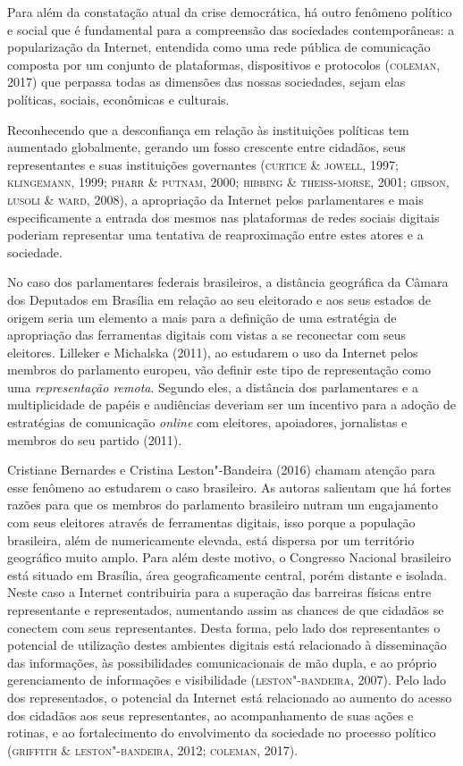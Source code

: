 Para além da constatação atual da crise democrática, há outro fenômeno
político e social que é fundamental para a compreensão das sociedades
contemporâneas: a popularização da Internet, entendida como uma rede
pública de comunicação composta por um conjunto de plataformas,
dispositivos e protocolos (\textsc{coleman}, 2017) que perpassa todas as
dimensões das nossas sociedades, sejam elas políticas, sociais,
econômicas e culturais.

Reconhecendo que a desconfiança em relação às instituições políticas tem
aumentado globalmente, gerando um fosso crescente entre cidadãos, seus
representantes e suas instituições governantes (\textsc{curtice \& jowell}, 1997;
\textsc{klingemann}, 1999; \textsc{pharr \& putnam}, 2000; \textsc{hibbing \& theiss-morse}, 2001;
\textsc{gibson, lusoli \& ward}, 2008), a apropriação da Internet pelos
parlamentares e mais especificamente a entrada dos mesmos nas
plataformas de redes sociais digitais poderiam representar uma tentativa
de reaproximação entre estes atores e a sociedade.

No caso dos parlamentares federais brasileiros, a distância geográfica
da Câmara dos Deputados em Brasília em relação ao seu eleitorado e aos
seus estados de origem seria um elemento a mais para a definição de uma
estratégia de apropriação das ferramentas digitais com vistas a se
reconectar com seus eleitores. Lilleker e Michalska (2011), ao estudarem
o uso da Internet pelos membros do parlamento europeu, vão definir este
tipo de representação como uma \textit{representação remota}. Segundo
eles, a distância dos parlamentares e a multiplicidade de papéis e
audiências deveriam ser um incentivo para a adoção de estratégias de
comunicação \textit{online} com eleitores, apoiadores, jornalistas e membros do
seu partido (2011).

Cristiane Bernardes e Cristina Leston"-Bandeira (2016) chamam atenção
para esse fenômeno ao estudarem o caso brasileiro. As autoras salientam
que há fortes razões para que os membros do parlamento brasileiro nutram
um engajamento com seus eleitores através de ferramentas digitais, isso
porque a população brasileira, além de numericamente elevada, está
dispersa por um território geográfico muito amplo. Para além deste
motivo, o Congresso Nacional brasileiro está situado em Brasília, área
geograficamente central, porém distante e isolada. Neste caso a Internet
contribuiria para a superação das barreiras físicas entre representante
e representados, aumentando assim as chances de que cidadãos se conectem
com seus representantes. Desta forma, pelo lado dos representantes o
potencial de utilização destes ambientes digitais está relacionado à
disseminação das informações, às possibilidades comunicacionais de mão
dupla, e ao próprio gerenciamento de informações e visibilidade
(\textsc{leston"-bandeira}, 2007). Pelo lado dos representados, o potencial da
Internet está relacionado ao aumento do acesso dos cidadãos aos seus
representantes, ao acompanhamento de suas ações e rotinas, e ao
fortalecimento do envolvimento da sociedade no processo político
(\textsc{griffith \& leston"-bandeira}, 2012; \textsc{coleman}, 2017).

